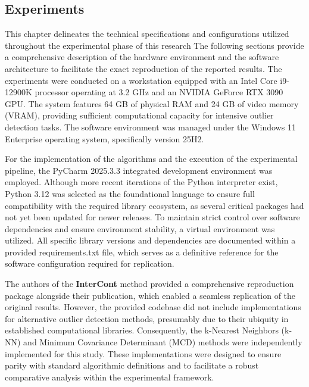 \subsection{Experiments}


This chapter delineates the technical specifications and configurations utilized throughout the experimental phase of this research
The following sections provide a comprehensive description of the hardware environment and the software architecture to facilitate the exact reproduction of the reported results. 
The experiments were conducted on a workstation equipped with an Intel Core i9-12900K processor operating at 3.2 GHz and an NVIDIA GeForce RTX 3090 GPU. 
The system features 64 GB of physical RAM and 24 GB of video memory (VRAM), providing sufficient computational capacity for intensive outlier detection tasks. 
The software environment was managed under the Windows 11 Enterprise operating system, specifically version 25H2. 


For the implementation of the algorithms and the execution of the experimental pipeline, the PyCharm 2025.3.3 integrated development environment was employed. 
Although more recent iterations of the Python interpreter exist, Python 3.12 was selected as the foundational language to ensure full compatibility with the required library ecosystem, as several critical packages had not yet been updated for newer releases. 
To maintain strict control over software dependencies and ensure environment stability, a virtual environment was utilized. 
All specific library versions and dependencies are documented within a provided requirements.txt file, which serves as a definitive reference for the software configuration required for replication.


The authors of the \textbf{InterCont} method provided a comprehensive reproduction package alongside their publication, which enabled a seamless replication of the original results. 
However, the provided codebase did not include implementations for alternative outlier detection methods, presumably due to their ubiquity in established computational libraries. 
Consequently, the k-Nearest Neighbors (k-NN) and Minimum Covariance Determinant (MCD) methods were independently implemented for this study. 
These implementations were designed to ensure parity with standard algorithmic definitions and to facilitate a robust comparative analysis within the experimental framework.

